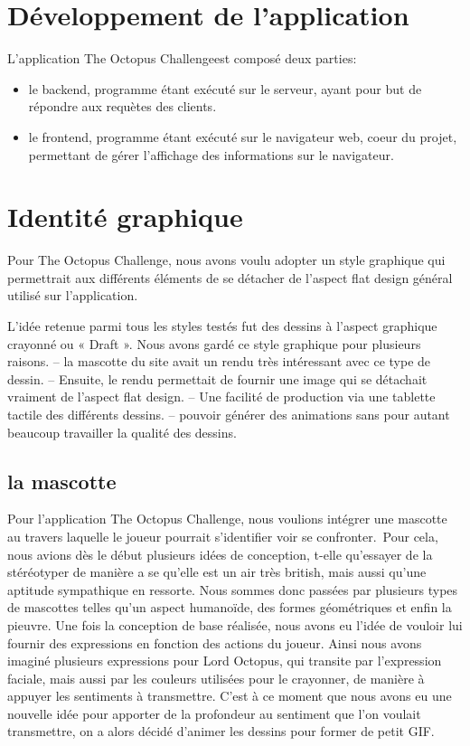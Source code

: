 \documentclass[a4paper,11pt, oneside]{book}
\def\appName{The Octopus Challenge}
\def\octopusName{Lord Octopus}
\begin{document}
\clearpage
\section{Développement de l'application}


L'application \appName est composé deux parties:
\begin{itemize}
	\item le backend, programme étant exécuté sur le serveur, ayant pour but de répondre aux requètes des clients.
	\item le frontend, programme étant exécuté sur le navigateur web, coeur du projet, permettant de gérer l'affichage des informations sur le navigateur.
\end{itemize}

\section{Identité graphique}
Pour \appName, nous avons voulu adopter un style graphique qui permettrait aux différents éléments de se détacher de l’aspect flat design général utilisé sur l’application.

L’idée retenue parmi tous les styles testés fut des dessins à l’aspect graphique crayonné ou « Draft ».
Nous avons gardé ce style graphique pour plusieurs raisons.
– la mascotte du site avait un rendu très intéressant avec ce type de dessin.
– Ensuite, le rendu permettait de fournir une image qui se détachait vraiment de l’aspect flat design.
– Une facilité de production via une tablette tactile des différents dessins.
– pouvoir générer des animations sans pour autant beaucoup travailler la qualité des dessins.

\subsection*{la mascotte}
Pour l’application \appName, nous voulions intégrer une mascotte au travers laquelle le joueur pourrait s’identifier voir se confronter.\
Pour cela, nous avions dès le début plusieurs idées de conception, t-elle qu’essayer de la stéréotyper de manière a se qu’elle est un air très british, mais aussi qu’une aptitude sympathique en ressorte.
Nous sommes donc passées par plusieurs types de mascottes telles qu’un aspect humanoïde, des formes géométriques et enfin la pieuvre.
Une fois la conception de base réalisée, nous avons eu l’idée de vouloir lui fournir des expressions en fonction des actions du joueur.
Ainsi nous avons imaginé plusieurs expressions pour \octopusName, qui transite par l’expression faciale, mais aussi par les couleurs utilisées pour le crayonner, de manière à appuyer les sentiments à transmettre. C’est à ce moment que nous avons eu une nouvelle idée pour apporter de la profondeur au sentiment que l’on voulait transmettre, on a alors décidé d’animer les dessins pour former de petit GIF.
\end{document}
